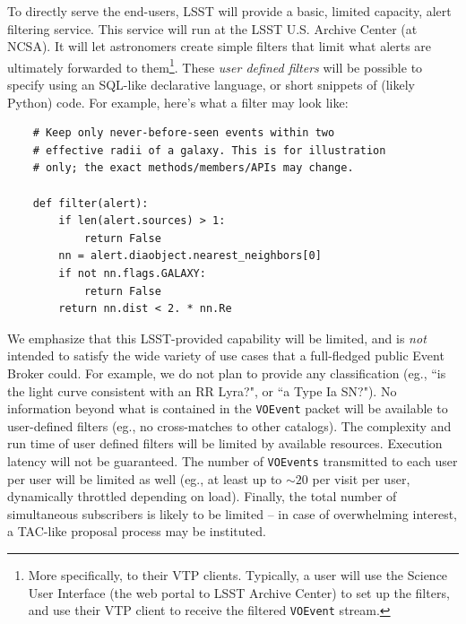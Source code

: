 \documentclass[12pt]{article}
\newcommand{\code}[1]{\texttt{#1}}
\newcommand{\VOEvent}{\code{VOEvent}\xspace}
\newcommand{\VOEvents}{\code{VOEvents}\xspace}
\begin{document}
To directly serve the end-users, LSST will provide a basic, limited capacity, alert filtering service. This service will run at the LSST U.S. Archive Center (at NCSA). It will let astronomers create simple filters that limit what alerts are ultimately forwarded to them\footnote{More specifically, to their VTP clients. Typically, a user will use the Science User Interface (the web portal to LSST Archive Center) to set up the filters, and use their VTP client to receive the filtered \VOEvent stream.}. These {\em user defined filters} will be possible to specify using an SQL-like declarative language, or short snippets of (likely Python) code. For example, here's what a filter may look like:
\begin{verbatim}
    # Keep only never-before-seen events within two
    # effective radii of a galaxy. This is for illustration
    # only; the exact methods/members/APIs may change.

    def filter(alert):
        if len(alert.sources) > 1:
            return False
        nn = alert.diaobject.nearest_neighbors[0]
        if not nn.flags.GALAXY:
            return False
        return nn.dist < 2. * nn.Re
\end{verbatim}

We emphasize that this LSST-provided capability will be limited, and is {\em not} intended to satisfy the wide variety of use cases that a full-fledged public Event Broker could. For example, we do not plan to provide any classification (eg., ``is the light curve consistent with an RR Lyra?", or ``a Type Ia SN?"). No information beyond what is contained in the \VOEvent packet will be available to user-defined filters (eg., no cross-matches to other catalogs). The complexity and run time of user defined filters will be limited by available resources. Execution latency will not be guaranteed. The number of \VOEvents transmitted to each user per user will be limited as well (eg., at least up to $\sim 20$ per visit per user, dynamically throttled depending on load). Finally, the total number of simultaneous subscribers is likely to be limited -- in case of overwhelming interest, a TAC-like proposal process may be instituted.
\end{document}
